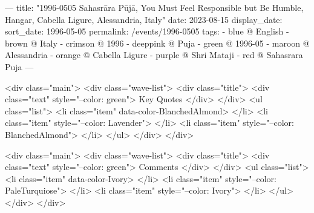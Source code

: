 ---
title: "1996-0505 Sahasrāra Pūjā, You Must Feel Responsible but Be Humble, Hangar, Cabella Ligure, Alessandria, Italy"
date: 2023-08-15
display_date: 
sort_date: 1996-05-05
permalink: /events/1996-0505
tags:
  - blue @ English
  - brown @ Italy
  - crimson @ 1996
  - deeppink @ Puja
  - green @ 1996-05
  - maroon @ Alessandria
  - orange @ Cabella Ligure
  - purple @ Shri Mataji
  - red @ Sahasrara Puja
---

<div class="main">
  <div class="wave-list">
    <div class="title">
      <div class="text" style="--color: green">
        Key Quotes
      </div>
    </div>
    <ul class="list">
        <li class="item" data-color-BlanchedAlmond>
        </li>
        <li class="item" style="--color: Lavender">
        </li>
        <li class="item" style="--color: BlanchedAlmond">
        </li>
      </ul>
  </div>
</div>

<div class="main">
  <div class="wave-list">
    <div class="title">
      <div class="text" style="--color: green">
        Comments
      </div>
    </div>
    <ul class="list">
        <li class="item" data-color-Ivory>
        </li>
        <li class="item" style="--color: PaleTurquiose">
        </li>
        <li class="item" style="--color: Ivory">
        </li>
      </ul>
  </div>
</div>